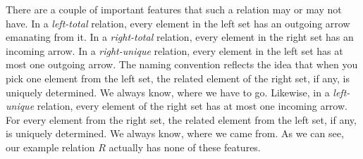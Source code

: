 \begin{figure}[h]
\label{Fig:RelationLessThan_123_024}
\centering
	
\end{figure}
There are a couple of important features that such a relation may or may not have. In a \emph{left-total} relation, every element in the left set has an outgoing arrow emanating from it. In a \emph{right-total} relation, every element in the right set has an incoming arrow. In a \emph{right-unique} relation, every element in the left set has at most one outgoing arrow. The naming convention reflects the idea that when you pick one element from the left set, the related  element of the right set, if any, is uniquely determined. We always know, where we have to go. Likewise, in a \emph{left-unique} relation, every element of the right set has at most one incoming arrow. For every element from the right set, the related element from the left set, if any, is uniquely determined. We always know, where we came from. As we can see, our example relation $R$ actually has none of these features.

